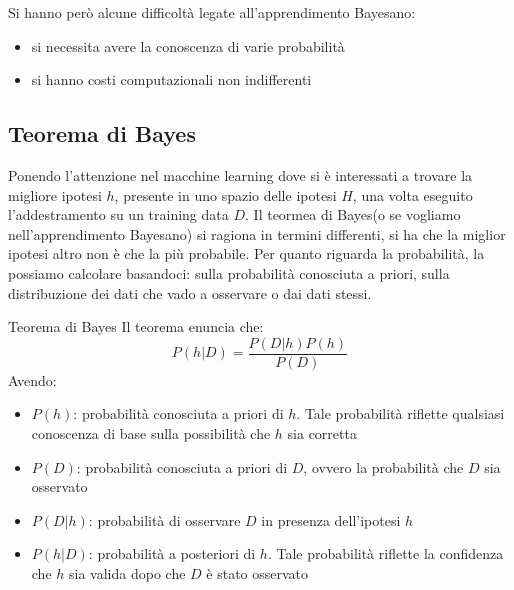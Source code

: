 Si hanno però alcune difficoltà legate all'apprendimento Bayesano:
\begin{itemize}
  \item si necessita avere la conoscenza di varie probabilità
  \item si hanno costi computazionali non indifferenti
\end{itemize}

\subsection{Teorema di Bayes}
Ponendo l'attenzione nel macchine learning dove si è interessati a trovare la migliore ipotesi $h$, presente in uno spazio delle ipotesi $H$, una volta eseguito l'addestramento su un training data $D$.  Il teormea di Bayes(o se vogliamo nell'apprendimento Bayesano) si ragiona in termini differenti, si ha che la miglior ipotesi altro non è che la più probabile. Per quanto riguarda la probabilità, la possiamo calcolare basandoci: sulla probabilità conosciuta a priori, sulla distribuzione dei dati che vado a osservare o dai dati stessi. 

\begin{teorema}{Teorema di Bayes}{}
    Il teorema enuncia che: \[P(h|D)=\frac{P(D|h)P(h)}{P(D)}\]
    Avendo:
    \begin{itemize}
        \item $P(h)$:   probabilità conosciuta a priori di $h$. Tale probabilità riflette qualsiasi conoscenza di base sulla possibilità che $h$ sia corretta  
        \item $P(D)$:   probabilità conosciuta a priori di $D$, ovvero la probabilità che $D$ sia osservato
        \item $P(D|h)$: probabilità di osservare $D$ in presenza dell'ipotesi $h$
        \item $P(h|D)$: probabilità a posteriori di $h$. Tale probabilità riflette la confidenza che $h$ sia valida dopo che $D$ è stato osservato
    \end{itemize}
\end{teorema}

